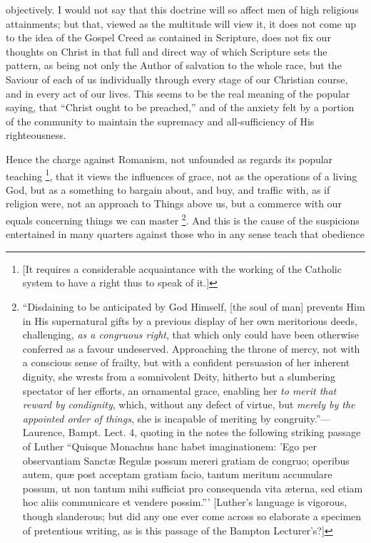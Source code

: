 objectively. I would not say that this doctrine will so affect men of
high religious attainments; but that, viewed as the multitude will
view it, it does not come up to the idea of the Gospel Creed as
contained in Scripture, does not fix our thoughts on Christ in that
full and direct way of which Scripture sets the pattern, as being not
only the Author of salvation to the whole race, but the Saviour of
each of us individually through every stage of our Christian course,
and in every act of our lives. This seems to be the real meaning of
the popular saying, that ``Christ ought to be preached,'' and
of the anxiety felt by a portion of the community to maintain the
supremacy and all-sufficiency of His righteousness.

Hence the charge against Romanism, not unfounded as regards its
popular teaching \footnote{[It requires a
considerable acquaintance with the working of the Catholic system to
have a right thus to speak of it.]}, that it
views the influences of grace, not as the operations of a living God,
but as a something to bargain about, and buy, and traffic with, as if religion were, not an approach to Things above us, but a
commerce with our equals concerning things we can master \footnote{``Disdaining to be anticipated by God Himself, [the soul of man]
prevents Him in His supernatural gifts by a previous display of her
own meritorious deeds, challenging, \emph{as a congruous right}, that
which only could have been otherwise conferred as a favour undeserved.
Approaching the throne of mercy, not with a conscious sense of
frailty, but with a confident persuasion of her inherent dignity, she
wrests from a somnivolent Deity, hitherto but a slumbering spectator
of her efforts, an ornamental grace, enabling her \emph{to merit that
reward by condignity}, which, without any defect of virtue, but \emph{merely
by the appointed order of things}, she is incapable of meriting by
congruity.''—Laurence, Bampt. Lect. 4, quoting in the notes the
following striking passage of Luther ``Quisque Monachus hanc habet
imaginationem: 'Ego per observantiam Sanctæ Regulæ possum mereri
gratiam de congruo; operibus autem, quæ post acceptam gratiam facio,
tantum meritum accumulare possum, ut non tantum mihi sufficiat pro
consequenda vita æterna, sed etiam hoc aliis communicare et vendere
possim.''' [Luther's language is vigorous, though slanderous; but
did any one ever come across so elaborate a specimen of pretentious
writing, as is this passage of the Bampton Lecturer's?]}. And this is the cause of the suspicions entertained in many
quarters against those who in any sense teach that obedience
